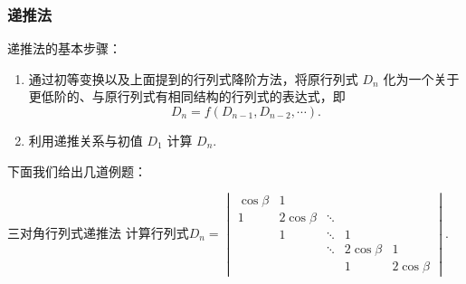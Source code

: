 \subsubsection{递推法}

递推法的基本步骤：

\begin{enumerate}
    \item 通过初等变换以及上面提到的行列式降阶方法，将原行列式 $D_n$ 化为一个关于更低阶的、与原行列式有相同结构的行列式的表达式，即
        \[
            D_n = f(D_{n-1}, D_{n-2}, \cdots).
        \]

    \item 利用递推关系与初值 $D_1$ 计算 $D_n$.
\end{enumerate}

下面我们给出几道例题：

\begin{example}{三对角行列式}{递推法}
    计算行列式$D_n=\begin{vmatrix}
            \cos \beta & 1            &        &              &              \\
            1          & 2 \cos \beta & \ddots &              &              \\
                       & 1            & \ddots & 1            &              \\
                       &              & \ddots & 2 \cos \beta & 1            \\
                       &              &        & 1            & 2 \cos \beta
        \end{vmatrix}$.
\end{example}

